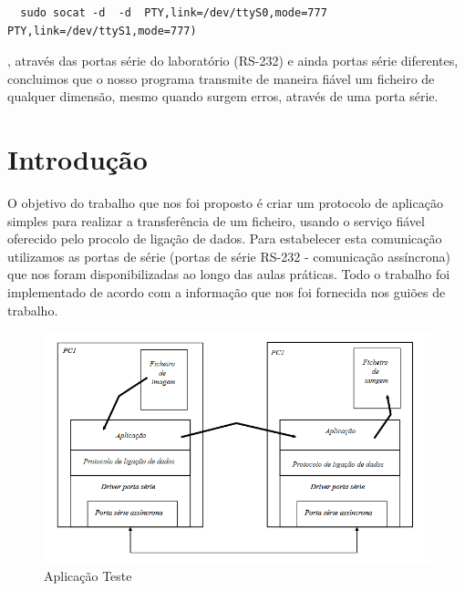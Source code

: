 \documentclass[article, a4paper, 11pt, oneside]{memoir}
\begin{document}
\begin{lstlisting}
  sudo socat -d  -d  PTY,link=/dev/ttyS0,mode=777   PTY,link=/dev/ttyS1,mode=777)
\end{lstlisting}

, através das portas série do laboratório (RS-232) e ainda portas série diferentes, concluimos
que o nosso programa transmite de maneira fiável um ficheiro de qualquer dimensão, mesmo quando
surgem erros, através de uma porta série.

\chapter[Introdução][Introdução]{Introdução} \label{\thechapter}

O objetivo do trabalho que nos foi proposto é criar um protocolo de aplicação simples para 
realizar a transferência de um ficheiro, usando o serviço fiável oferecido pelo procolo de 
ligação de dados. Para estabelecer esta comunicação utilizamos as portas de série (portas de série 
RS-232 - comunicação assíncrona) que nos foram disponibilizadas ao longo das aulas práticas.
Todo o trabalho foi implementado de acordo com a informação que nos foi fornecida nos guiões
de trabalho. 

\begin{figure}[htbp]
    \centering        
    \includegraphics[scale=0.5]{img/aplicacao_teste.png}
    \caption{Aplicação Teste}
    \label{fig:Figura1}
\end{figure}
\end{document}
